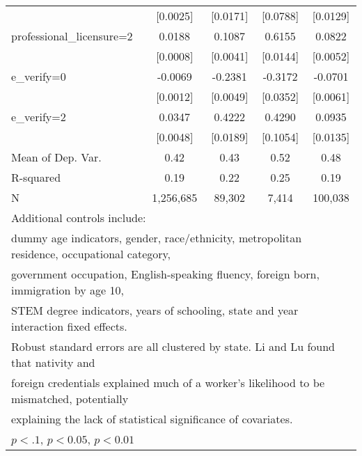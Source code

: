 \begin{table}[htbp]
\begin{tabular}{l*{4}{c}}
                    &    [0.0025]         &    [0.0171]         &    [0.0788]         &    [0.0129]         \\
\addlinespace
professional\_licensure=2&      0.0188\sym{***}&      0.1087\sym{***}&      0.6155\sym{***}&      0.0822\sym{***}\\
                    &    [0.0008]         &    [0.0041]         &    [0.0144]         &    [0.0052]         \\
\addlinespace
e\_verify=0          &     -0.0069\sym{***}&     -0.2381\sym{***}&     -0.3172\sym{***}&     -0.0701\sym{***}\\
                    &    [0.0012]         &    [0.0049]         &    [0.0352]         &    [0.0061]         \\
\addlinespace
e\_verify=2          &      0.0347\sym{***}&      0.4222\sym{***}&      0.4290\sym{***}&      0.0935\sym{***}\\
                    &    [0.0048]         &    [0.0189]         &    [0.1054]         &    [0.0135]         \\
\midrule
Mean of Dep. Var.   &        0.42         &        0.43         &        0.52         &        0.48         \\
R-squared           &        0.19         &        0.22         &        0.25         &        0.19         \\
N                   &   1,256,685         &      89,302         &       7,414         &     100,038         \\
\bottomrule
\multicolumn{5}{l}{\footnotesize Additional controls include:}\\
\multicolumn{5}{l}{\footnotesize dummy age indicators, gender, race/ethnicity, metropolitan residence, occupational category,}\\
\multicolumn{5}{l}{\footnotesize government occupation, English-speaking fluency, foreign born, immigration by age 10,}\\
\multicolumn{5}{l}{\footnotesize STEM degree indicators, years of schooling, state and year interaction fixed effects.}\\
\multicolumn{5}{l}{\footnotesize Robust standard errors are all clustered by state. Li and Lu found that nativity and}\\
\multicolumn{5}{l}{\footnotesize foreign credentials explained much of a worker's likelihood to be mismatched, potentially}\\
\multicolumn{5}{l}{\footnotesize explaining the lack of statistical significance of covariates.}\\
\multicolumn{5}{l}{\footnotesize \sym{*} \(p<.1\), \sym{**} \(p<0.05\), \sym{***} \(p<0.01\)}\\
\end{tabular}
\end{table}
